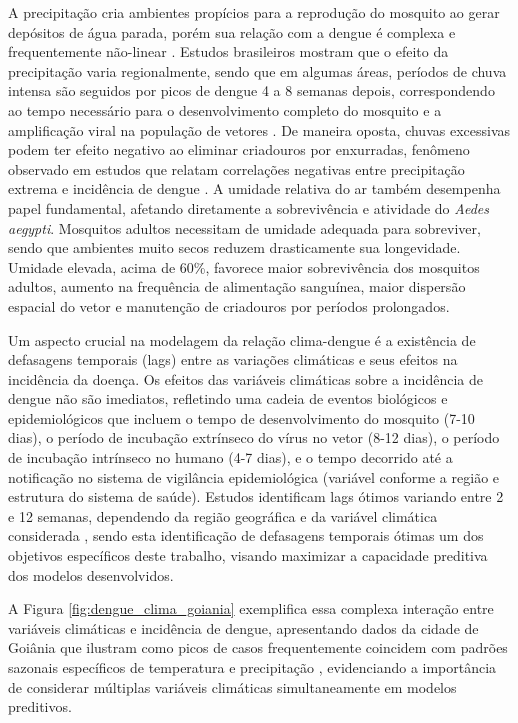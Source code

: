 A precipitação cria ambientes propícios para a reprodução do mosquito ao gerar depósitos de água parada, porém sua relação com a dengue é complexa e frequentemente não-linear \cite{health_impact_dengue_precipitation_sp}. Estudos brasileiros mostram que o efeito da precipitação varia regionalmente, sendo que em algumas áreas, períodos de chuva intensa são seguidos por picos de dengue 4 a 8 semanas depois, correspondendo ao tempo necessário para o desenvolvimento completo do mosquito e a amplificação viral na população de vetores \cite{analysis_climate_factors_dengue,the_occurrence_dengue_weather_brazil}. De maneira oposta, chuvas excessivas podem ter efeito negativo ao eliminar criadouros por enxurradas, fenômeno observado em estudos que relatam correlações negativas entre precipitação extrema e incidência de dengue \cite{health_impact_dengue_precipitation_sp}. A umidade relativa do ar também desempenha papel fundamental, afetando diretamente a sobrevivência e atividade do \textit{Aedes aegypti}. Mosquitos adultos necessitam de umidade adequada para sobreviver, sendo que ambientes muito secos reduzem drasticamente sua longevidade. Umidade elevada, acima de 60\%, favorece maior sobrevivência dos mosquitos adultos, aumento na frequência de alimentação sanguínea, maior dispersão espacial do vetor e manutenção de criadouros por períodos prolongados.

Um aspecto crucial na modelagem da relação clima-dengue é a existência de defasagens temporais (lags) entre as variações climáticas e seus efeitos na incidência da doença. Os efeitos das variáveis climáticas sobre a incidência de dengue não são imediatos, refletindo uma cadeia de eventos biológicos e epidemiológicos que incluem o tempo de desenvolvimento do mosquito (7-10 dias), o período de incubação extrínseco do vírus no vetor (8-12 dias), o período de incubação intrínseco no humano (4-7 dias), e o tempo decorrido até a notificação no sistema de vigilância epidemiológica (variável conforme a região e estrutura do sistema de saúde). Estudos identificam lags ótimos variando entre 2 e 12 semanas, dependendo da região geográfica e da variável climática considerada \cite{analysis_climate_factors_dengue,health_impact_dengue_precipitation_sp}, sendo esta identificação de defasagens temporais ótimas um dos objetivos específicos deste trabalho, visando maximizar a capacidade preditiva dos modelos desenvolvidos.

A Figura \ref{fig:dengue_clima_goiania} exemplifica essa complexa interação entre variáveis climáticas e incidência de dengue, apresentando dados da cidade de Goiânia que ilustram como picos de casos frequentemente coincidem com padrões sazonais específicos de temperatura e precipitação \cite{basedosdados2024dengue}, evidenciando a importância de considerar múltiplas variáveis climáticas simultaneamente em modelos preditivos.

